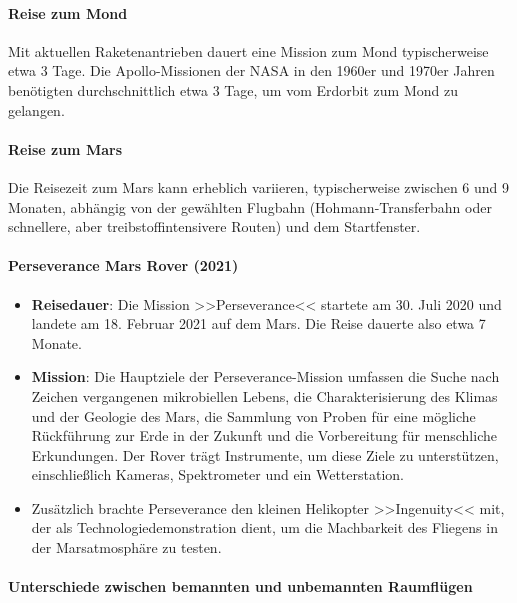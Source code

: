 \documentclass{vorlage-design-main}
\begin{document}
\hypertarget{reise-zum-mond}{%
\paragraph{Reise zum Mond}\label{reise-zum-mond}}

Mit aktuellen Raketenantrieben dauert eine Mission zum Mond
typischerweise etwa 3 Tage. Die Apollo-Missionen der NASA in den 1960er
und 1970er Jahren benötigten durchschnittlich etwa 3 Tage, um vom
Erdorbit zum Mond zu gelangen.

\hypertarget{reise-zum-mars}{%
\paragraph{Reise zum Mars}\label{reise-zum-mars}}

Die Reisezeit zum Mars kann erheblich variieren, typischerweise zwischen
6 und 9 Monaten, abhängig von der gewählten Flugbahn
(Hohmann-Transferbahn oder schnellere, aber treibstoffintensivere
Routen) und dem Startfenster.

\hypertarget{perseverance-mars-rover-2021}{%
\paragraph{Perseverance Mars Rover
(2021)}\label{perseverance-mars-rover-2021}}

\begin{itemize}

\item
  \textbf{Reisedauer}: Die Mission >>Perseverance<< startete am 30. Juli
  2020 und landete am 18. Februar 2021 auf dem Mars. Die Reise dauerte
  also etwa 7 Monate.
\item
  \textbf{Mission}: Die Hauptziele der Perseverance-Mission umfassen die
  Suche nach Zeichen vergangenen mikrobiellen Lebens, die
  Charakterisierung des Klimas und der Geologie des Mars, die Sammlung
  von Proben für eine mögliche Rückführung zur Erde in der Zukunft und
  die Vorbereitung für menschliche Erkundungen. Der Rover trägt
  Instrumente, um diese Ziele zu unterstützen, einschließlich Kameras,
  Spektrometer und ein Wetterstation.
\item
  Zusätzlich brachte Perseverance den kleinen Helikopter >>Ingenuity<<
  mit, der als Technologiedemonstration dient, um die Machbarkeit des
  Fliegens in der Marsatmosphäre zu testen.
\end{itemize}

\hypertarget{unterschiede-zwischen-bemannten-und-unbemannten-raumfluxfcgen}{%
\paragraph{Unterschiede zwischen bemannten und unbemannten
Raumflügen}\label{unterschiede-zwischen-bemannten-und-unbemannten-raumfluegen}}
\end{document}
